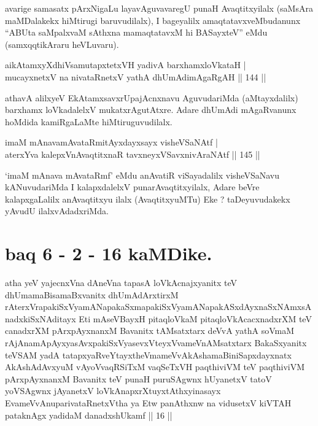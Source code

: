 \begin{artha}
avarige samasatx pArxNigaLu layavAguvavaregU punaH Avaqtitxyilalx
(saMsAra maMDalakekx hiMtirugi baruvudilalx), I bageyalilx
amaqtatavxveMbudanunx ``ABUta saMpalxvaM sAthxna mamaqtatavxM
hi BASayxteV'' eMdu (samxqqtikAraru heVLuvaru).
\end{artha}


\begin{shl}
aikAtamxyXdhiVsamutapxtetxVH yadivA barxhamxloVkataH | \\
mucayxnetxV na nivataRnetxV yathA dhUmAdimAgaRgAH \hfill|| 144 || 
\end{shl}

\begin{artha}
athavA alilxyeV EkAtamxsavxrUpajAcnxnavu AguvudariMda (aMtayxdalilx)
barxhamx loVkadalelxV mukatxrAgutAtxre. Adare dhUmAdi mAgaRvanunx
hoMdida kamiRgaLaMte hiMtiruguvudilalx.
\end{artha}


\begin{shl}
imaM mAnavamAvataRmitAyxdayxsayx visheVSaNAtf | \\
aterxYva kalepxV\s nAvaqtitxnaR tavxneyxVSavxnivAraNAtf \hfill|| 145 || 
\end{shl}

\begin{artha}
`imaM mAnava mAvataRmf' eMdu anAvatiR viSayadalilx visheVSaNavu  kANuvudariMda I kalapxdalelxV punarAvaqtitxyilalx, Adare beVre  kalapxgaLalilx anAvaqtitxyu ilalx (AvaqtitxyuMTu) Eke ? taDeyuvudakekx  yAvudU ilalxvAdadxriMda.
\end{artha}

\section*{baq 6 - 2 - 16 kaMDike.}

\begin{shl}
atha yeV yajecnxVna dAneVna tapasA loVkAcnajxyanitx teV dhUmamaBisamaBxvanitx dhUmAdArxtirxM rAterxVrapakiSxVyamANapakaSxmapakiSxVyamANapakASxdAyxnaSxNAmxsAnadxkiSxNAditayx Eti mAseVBayxH pitaqloVkaM pitaqloVkAcacxnadxrXM teV canadxrXM pArxpAyxnanxM Bavanitx tAMsatxtarx deVvA yathA soVmaM rAjAnamApAyxyasAvxpakiSxVyasevxVteyxVvameVnAMsatxtarx BakaSxyanitx teVSAM yadA tatapxyaRveYtayxtheVmameVvAkAshamaBiniSapxdayxnatx AkAshAdAvxyuM vAyoVvaqRSiTxM vaqSeTxVH paqthiviVM teV paqthiviVM pArxpAyxnanxM Bavanitx teV punaH puruSAgwnx hUyanetxV tatoV yoVSAgwnx jAyanetxV loVkAnapxrXtuyxtAthxyinasayx EvameVvAnuparivataRnetxV\s tha ya Etw panAthxnw na vidusetxV kiVTAH pataknAgx yadidaM danadxshUkamf || 16 ||
\end{shl}

